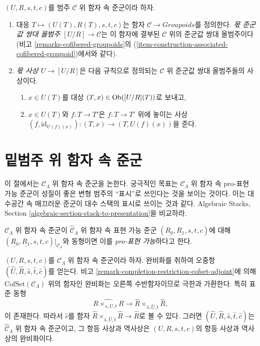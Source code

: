 \begin{definition}
\label{definition-quotient}
$(U, R, s, t, c)$를 범주 $\mathcal{C}$ 위 함자 속 준군이라 하자.
\begin{enumerate}
\item 대응 $T \mapsto  (U(T), R(T), s, t, c)$는 함자
$\mathcal{C} \to \textit{Groupoids}$를 정의한다.
{\it 몫 준군값 쌍대 올범주 $[U/R] \to \mathcal{C}$}는 이 함자에
결부된 $\mathcal{C}$ 위의 준군값 쌍대 올범주이다(비고
\ref{remarks-cofibered-groupoids}의
(\ref{item-construction-associated-cofibered-groupoid})에서와 같다).
\item {\it 몫 사상 $U \to [U/R]$}은 다음 규칙으로 정의되는
$\mathcal{C}$ 위 준군값 쌍대 올범주들의 사상이다.
\begin{enumerate}
\item $x \in U(T)$를 대상 $(T, x) \in \mathop{\mathrm{Ob}}\nolimits([U/R](T))$로 보내고,
\item $x \in U(T)$와 $f : T \to T'$은 $f : T \to T'$ 위에 놓이는 사상
$(f, \text{id}_{U(f)(x)}): (T, x) \to (T, U(f)(x))$을 준다.
\end{enumerate}
\end{enumerate}
\end{definition}





\section{밑범주 위 함자 속 준군}
\label{section-prorepresentable-groupoids-in-functors}

\noindent
이 절에서는 $\mathcal{C}_\Lambda$ 위 함자 속 준군을 논한다.
궁극적인 목표는 $\mathcal{C}_\Lambda$ 위 함자 속 pro-표현 가능 준군이
성질이 좋은 변형 범주의 ``표시''로 쓰인다는 것을 보이는 것이다.
이는 대수공간 속 매끄러운 준군이 대수 스택의 표시로 쓰이는 것과 같다.
Algebraic Stacks, Section
\ref{algebraic-section-stack-to-presentation}을 비교하라.

\begin{definition}
\label{definition-prorepresentable-groupoid-in-functors}
$\mathcal{C}_\Lambda$ 위 함자 속 준군이
$\widehat{\mathcal{C}}_\Lambda$ 위 함자 속 표현 가능 준군
$(\underline{R_0}, \underline{R_1}, s, t, c)$에 대해
$(\underline{R_0}, \underline{R_1}, s, t, c)|_{\mathcal{C}_\Lambda}$와
동형이면 이를 {\it pro-표현 가능}하다고 한다.
\end{definition}

\noindent
$(U, R, s, t, c)$를 $\mathcal{C}_\Lambda$ 위 함자 속 준군이라 하자.
완비화를 취하여 오중항
$(\widehat{U}, \widehat{R}, \widehat{s}, \widehat{t}, \widehat{c})$를
얻는다. 비고 \ref{remark-completion-restriction-cofset-adjoint}에 의해
$\text{CofSet}(\mathcal{C}_\Lambda)$ 위의 함자인 완비화는 오른쪽
수반함자이므로 극한과 가환한다. 특히 표준 동형
$$
\widehat{R \times_{s, U, t} R}
\longrightarrow
\widehat{R} \times_{\widehat{s}, \widehat{U}, \widehat{t}} \widehat{R},
$$
이 존재한다. 따라서 $\widehat{c}$를 함자
$\widehat{R} \times_{\widehat{s}, \widehat{U}, \widehat{t}} \widehat{R} \to
\widehat{R}$로 볼 수 있다. 그러면
$(\widehat{U}, \widehat{R}, \widehat{s}, \widehat{t}, \widehat{c})$는
$\widehat{\mathcal{C}}_\Lambda$ 위 함자 속 준군이고, 그 항등 사상과
역사상은 $(U, R, s, t, c)$의 항등 사상과 역사상의 완비화이다.

